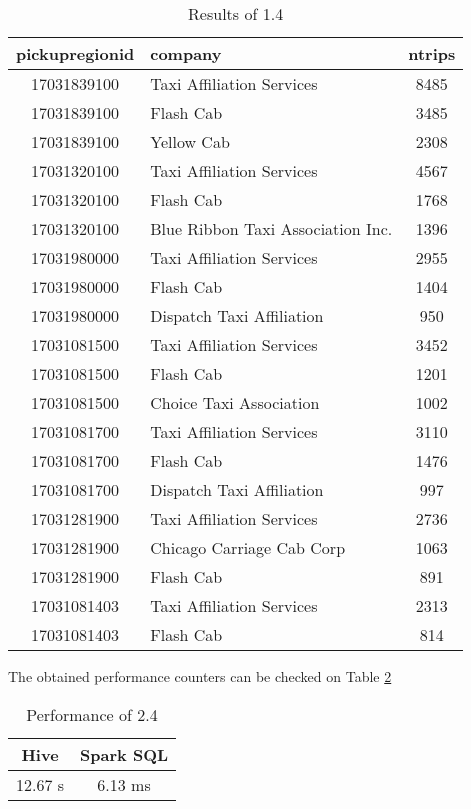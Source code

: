 \documentclass[conference,compsoc]{IEEEtran}
\begin{document}
\begin{table}[!t]
\renewcommand{\arraystretch}{1.4}
\caption{Results of  1.4}
\label{perf_1_4}
\centering
\begin{tabular}{c||l|c}
\hline
\bfseries pickupregionid &\bfseries company   & \bfseries ntrips \\
\hline\hline
17031839100 &Taxi Affiliation Services        & 8485  \\
17031839100 &Flash Cab                        & 3485  \\
17031839100 &Yellow Cab                       & 2308  \\
\hline
17031320100 &Taxi Affiliation Services        & 4567  \\
17031320100 &Flash Cab                        & 1768  \\
17031320100 &Blue Ribbon Taxi Association Inc.& 1396  \\
\hline
17031980000 &Taxi Affiliation Services        & 2955  \\
17031980000 &Flash Cab                        & 1404  \\
17031980000 &Dispatch Taxi Affiliation        & 950   \\
\hline
17031081500 &Taxi Affiliation Services        & 3452  \\
17031081500 &Flash Cab                        & 1201  \\
17031081500 &Choice Taxi Association          & 1002  \\
\hline
17031081700 &Taxi Affiliation Services        & 3110  \\
17031081700 &Flash Cab                        & 1476  \\
17031081700 &Dispatch Taxi Affiliation        & 997   \\
\hline
17031281900 &Taxi Affiliation Services        & 2736  \\
17031281900 &Chicago Carriage Cab Corp        & 1063  \\
17031281900 &Flash Cab                        & 891   \\
\hline
17031081403 &Taxi Affiliation Services        & 2313  \\
17031081403 &Flash Cab                        & 814   \\
\hline
\end{tabular}
\end{table}

The obtained performance counters can be checked on Table \ref{perf_2_4}

\begin{table}[!t]
\renewcommand{\arraystretch}{1.3}
\caption{Performance of 2.4}
\label{perf_2_4}
\centering
\begin{tabular}{c|c}
\hline
\bfseries Hive & \bfseries Spark SQL \\
\hline\hline
12.67 s        & 6.13 ms    \\
\hline
\end{tabular}
\end{table}
\end{document}
